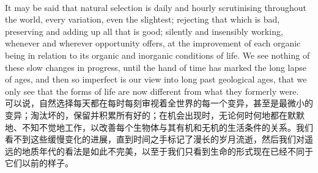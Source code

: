 \documentclass{article}
\begin{document}
\\
It may be said that natural selection is daily and hourly scrutinising throughout the world, every variation, even the slightest; rejecting that which is bad, preserving and adding up all that is good; silently and insensibly working, whenever and wherever opportunity offers, at the improvement of each organic being in relation to its organic and inorganic conditions of life. We see nothing of these slow changes in progress, until the hand of time has marked the long lapse of ages, and then so imperfect is our view into long past geological ages, that we only see that the forms of life are now different from what they formerly were.\\
可以说，自然选择每天都在每时每刻审视着全世界的每一个变异，甚至是最微小的变异；淘汰坏的，保留并积累所有好的；在机会出现时，无论何时何地都在默默地、不知不觉地工作，以改善每个生物体与其有机和无机的生活条件的关系。我们看不到这些缓慢变化的进展，直到时间之手标记了漫长的岁月流逝，然后我们对遥远的地质年代的看法是如此不完美，以至于我们只看到生命的形式现在已经不同于它们以前的样子。
\end{document}
